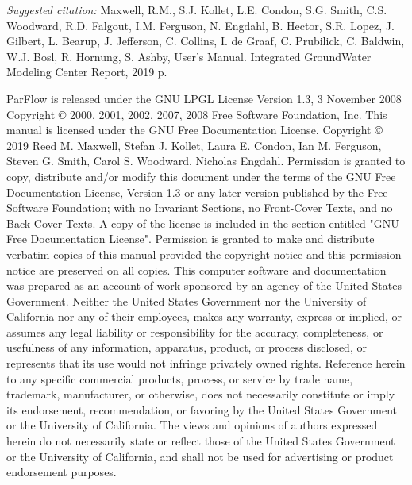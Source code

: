 \documentclass{book}
\begin{document}

\begin{CopyrightPage}
{\em Suggested citation: }Maxwell, R.M., S.J. Kollet,  L.E. Condon, S.G. Smith, C.S. Woodward, R.D. Falgout, I.M. Ferguson, N. Engdahl, B. Hector, S.R. Lopez, J. Gilbert, L. Bearup, J. Jefferson, C. Collins, I. de Graaf, C. Prubilick, C. Baldwin, W.J. Bosl, R. Hornung, S. Ashby, \parflow{} User's Manual. Integrated GroundWater Modeling Center Report, 2019 \pageref{end}p.\newline

{ \scriptsize
\noindent ParFlow is released under the GNU LPGL License \newline
\noindent Version 1.3, 3 November 2008 \newline
\noindent Copyright \copyright{} 2000, 2001, 2002, 2007, 2008  Free Software Foundation, Inc.\newline
{}\newline
This manual is licensed under the GNU Free Documentation License.\newline%
Copyright \copyright{} 2019  Reed M. Maxwell, Stefan J. Kollet, Laura E. Condon, Ian M. Ferguson, Steven G. Smith, Carol S. Woodward, Nicholas Engdahl.
Permission is granted to copy, distribute and/or modify this document
under the terms of the GNU Free Documentation License, Version 1.3
or any later version published by the Free Software Foundation; with no Invariant Sections, no Front-Cover Texts, and no Back-Cover Texts. A copy of the license is included in the section entitled "GNU Free Documentation License".
Permission is granted to make and distribute verbatim copies of this
manual provided the copyright notice and this permission notice are
preserved on all copies.\newline\vspace{0.1em}
This computer software and documentation was prepared as an account of
work sponsored by an agency of the United  States Government.  Neither
the United States Government nor the  University of California nor any
of their employees, makes any warranty, express or implied, or assumes
any legal liability  or responsibility for the accuracy, completeness,
or   usefulness of any   information,  apparatus, product, or  process
disclosed,   or represents that  its  use would not infringe privately
owned rights.  Reference  herein to any specific  commercial products,
process,   or service by   trade  name,  trademark,  manufacturer,  or
otherwise, does not  necessarily constitute or imply its  endorsement,
recommendation, or  favoring  by the  United  States Government or the
University of California.  The views and opinions of authors expressed
herein do not necessarily state or reflect those  of the United States
Government or the University of California, and shall  not be used for
advertising or product endorsement purposes.}
\end{CopyrightPage}
\end{document}
